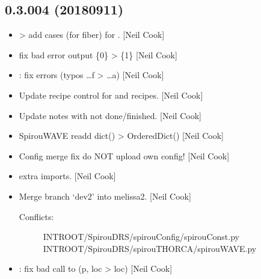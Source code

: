\documentclass[a4paper,10pt,english]{report}
\begin{document}
\subsection{0.3.004 (2018\sphinxhyphen{}09\sphinxhyphen{}11)}
\label{\detokenize{misc/changelog:id349}}\begin{itemize}
\item {} 
 \textendash{}\textgreater{} add cases (for fiber) for .
{[}Neil Cook{]}

\item {} 
 \sphinxhyphen{} fix bad error output \{0\} \textendash{}\textgreater{} \{1\} {[}Neil Cook{]}

\item {} 
: fix errors (typos …f \textendash{}\textgreater{} …a) {[}Neil Cook{]}

\item {} 
Update recipe control for  and  recipes. {[}Neil Cook{]}

\item {} 
Update notes with not done/finished. {[}Neil Cook{]}

\item {} 
SpirouWAVE \sphinxhyphen{} re\sphinxhyphen{}add dict() \textendash{}\textgreater{} OrderedDict() {[}Neil Cook{]}

\item {} 
Config \sphinxhyphen{} merge fix \sphinxhyphen{} do NOT upload own config! {[}Neil Cook{]}

\item {} 
 \sphinxhyphen{} extra imports. {[}Neil Cook{]}

\item {} 
Merge branch ‘dev2’ into melissa2. {[}Neil Cook{]}
\begin{description}
\item[{Conflicts:}] \leavevmode
{}
INTROOT/SpirouDRS/spirouConfig/spirouConst.py
INTROOT/SpirouDRS/spirouTHORCA/spirouWAVE.py

\end{description}

\item {} 
: fix bad call to  (p, loc \textendash{}\textgreater{} loc)
{[}Neil Cook{]}


\end{itemize}
\end{document}
